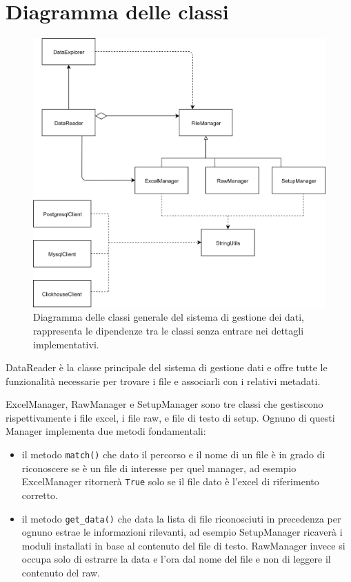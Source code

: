 \section{Diagramma delle classi} \label{DiagrammaDelleClassiDMD}

\begin{figure}
	\includegraphics[width=\textwidth]{figures/DiagrammaDelleClassiDMD}
	\caption[Diagramma delle classi sistema di gestione dei dati]{Diagramma delle classi generale del sistema di gestione dei dati, rappresenta le dipendenze tra le classi senza entrare nei dettagli implementativi. 
		\label{fig:DiagrammaDelleClassiDMD}}
\end{figure}


DataReader è la classe principale del sistema di gestione dati e offre tutte le funzionalità necessarie per trovare i file e associarli con i relativi metadati.

ExcelManager, RawManager e SetupManager sono tre classi che gestiscono rispettivamente i file excel, i file raw, e file di testo di setup. Ognuno di questi Manager implementa due metodi fondamentali:

\begin{itemize}
	\item il metodo \texttt{match()} che dato il percorso e il nome di un file è in grado di riconoscere se è un file di interesse per quel manager, ad esempio ExcelManager ritornerà \texttt{True} solo se il file dato è l'excel di riferimento corretto.
	
	\item il metodo \texttt{get\_data()} che data la lista di file riconosciuti in precedenza per ognuno estrae le informazioni rilevanti, ad esempio SetupManager ricaverà i moduli installati in base al contenuto del file di testo. RawManager invece si occupa solo di estrarre la data e l'ora dal nome del file e non di leggere il contenuto del raw.
\end{itemize}

